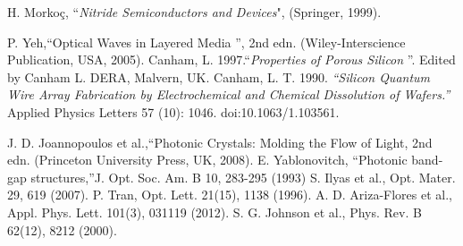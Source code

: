 \documentclass[a4paper,11pt,]{book}
\begin{document}
\backmatter
\nocite{*}
%

 \small{
\begin{thebibliography}{X}
 H. Morkoç, “\emph{Nitride Semiconductors and Devices}", (Springer, 1999).

 P. Yeh,\textquotedblleft Optical Waves in Layered Media \textquotedblright, 2nd edn. (Wiley-Interscience Publication,
USA, 2005).
Canham, L. 1997.\textquotedblleft \emph{Properties of Porous Silicon}  \textquotedblright. Edited by Canham L. DERA, Malvern, UK.
Canham, L. T. 1990. \emph{\textquotedblleft Silicon Quantum Wire Array Fabrication by Electrochemical and Chemical Dissolution of Wafers.\textquotedblright } Applied Physics Letters 57 (10): 1046. doi:10.1063/1.103561.


 J. D. Joannopoulos et al.,\textquotedblleft Photonic Crystals: Molding the Flow of Light, 2nd edn.
(Princeton University Press, UK, 2008).
 E. Yablonovitch, \textquotedblleft Photonic band-gap structures,\textquotedblright J. Opt. Soc. Am. B 10, 283-295 (1993)
 S. Ilyas et al., Opt. Mater. 29, 619 (2007).
 P. Tran, Opt. Lett. 21(15), 1138 (1996).
 A. D. Ariza-Flores et al., Appl. Phys. Lett. 101(3), 031119 (2012).
 S. G. Johnson et al., Phys. Rev. B 62(12), 8212 (2000).


\end{thebibliography}}
\end{document}
